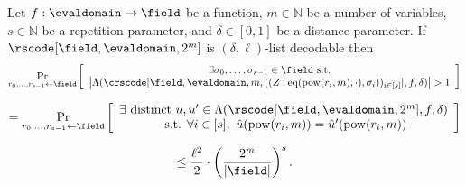 \begin{lemma}\label{lemma:out_of_domain_sampling_crs_eq_rs}
    Let $f : \evaldomain \rightarrow \field$ be a function, $m \in \mathbb{N}$ be a number of variables, $s \in \mathbb{N}$ be a repetition parameter, and $\delta \in [0,1]$ be a distance parameter. If $\rscode[\field, \evaldomain, 2^m]$ is $(\delta, \ell)$-list decodable then
    \[
    \Pr_{r_0, \dots, r_{s-1} \leftarrow \field} \left[
    \begin{array}{c}
    \exists \sigma_0, \dots, \sigma_{s-1} \in \field \text{ s.t.} \\
    \left| \Lambda(\crscode[\field, \evaldomain, m, ((Z \cdot \mathrm{eq}(\mathrm{pow}(r_{i}, m), \cdot), \sigma_{i}))_{i \in [s]}], f, \delta) \right| > 1
    \end{array}
    \right]
    \]

    \[
    = \Pr_{r_0, \dots, r_{s-1} \leftarrow \field} \left[
    \begin{array}{c}
    \exists \text{ distinct } u, u' \in \Lambda(\rscode[\field, \evaldomain, 2^m], f, \delta) \\
    \text{ s.t. } \forall i \in [s],\ \hat{u}(\mathrm{pow}(r_i, m)) = \hat{u}'(\mathrm{pow}(r_i, m))
    \end{array}
    \right]
    \]

    \[
    \leq \frac{\ell^2}{2} \cdot \left( \frac{2^m}{|\field|} \right)^s.
    \]
\end{lemma}

